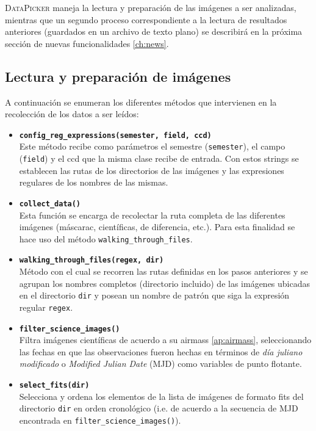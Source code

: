 \textsc{DataPicker} maneja  la lectura y preparaci\'on de las im\'agenes a ser analizadas, mientras que un segundo proceso correspondiente a la lectura de resultados anteriores (guardados en un archivo de texto plano) se describir\'a en la pr\'oxima secci\'on de nuevas funcionalidades \ref{ch:news}. 
\bigskip
  
\subsection{Lectura y preparaci\'on de im\'agenes}
A continuaci\'on se enumeran los diferentes m\'etodos que intervienen en la recolecci\'on de los datos a ser le\'idos:

\begin{itemize}
\item \textbf{\texttt{config\_reg\_expressions(semester, field, ccd)}}\\
Este m\'etodo recibe como par\'ametros el semestre (\texttt{semester}), el campo (\texttt{field}) y el ccd que la misma clase recibe de entrada. Con estos strings se establecen las rutas de los directorios de las im\'agenes y las expresiones regulares de los nombres de las mismas.
\bigskip

\item \textbf{\texttt{collect\_data()}}\\
Esta funci\'on se encarga de recolectar la ruta completa de las diferentes im\'agenes (m\'ascarac, cient\'ificas, de diferencia, etc.). Para esta finalidad se hace uso del m\'etodo \texttt{walking\_through\_files}. 
\bigskip

\item \textbf{\texttt{walking\_through\_files(regex, dir)}}\\
M\'etodo con el cual se recorren las rutas definidas en los pasos anteriores y se agrupan los nombres completos (directorio incluido) de las im\'agenes ubicadas en el directorio \texttt{dir} y posean un nombre de patr\'on que siga la expresi\'on regular \texttt{regex}.
\bigskip

\item \textbf{\texttt{filter\_science\_images()}}\\
Filtra im\'agenes cient\'ificas de acuerdo a su airmass \ref{ap:airmass}, seleccionando las fechas en que las observaciones fueron hechas en t\'erminos de \textit{d\'ia juliano modificado} o \textit{Modified Julian Date} (MJD) como variables de punto flotante.
\bigskip

\item \textbf{\texttt{select\_fits(dir)}}\\
Selecciona y ordena los elementos de la lista de im\'agenes de formato fits del directorio \texttt{dir} en orden cronol\'ogico (i.e. de acuerdo a la secuencia de MJD encontrada en \texttt{filter\_science\_images()}).
\bigskip


\end{itemize}
